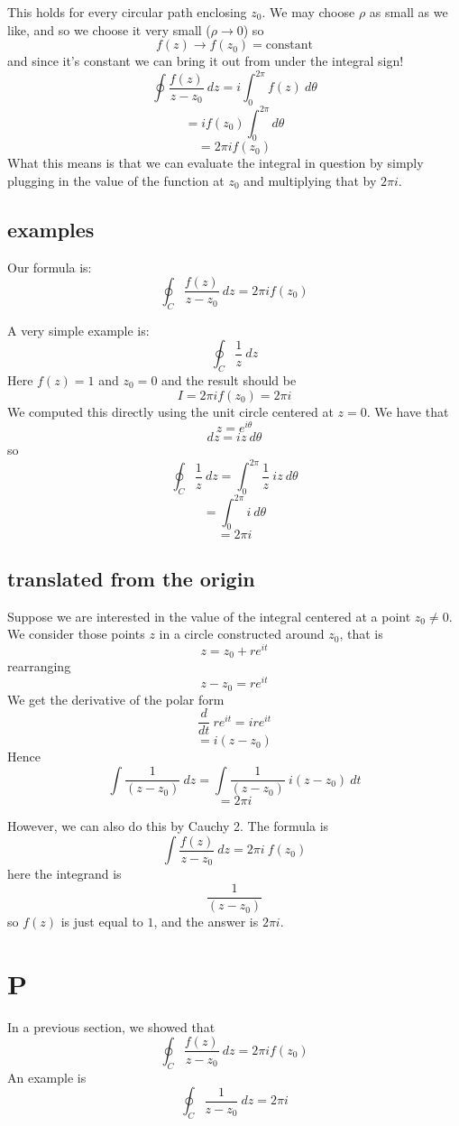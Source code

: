 \documentclass[11pt, oneside]{article}   	%
\begin{document}
This holds for every circular path enclosing $z_0$.  We may choose $\rho$ as small as we like, and so we choose it very small ($\rho \rightarrow 0$) so
\[ f(z) \rightarrow f(z_0) = \text{constant} \]
and since it's constant we can bring it out from under the integral sign!
\[  \oint \frac{f(z)}{z - z_0} \ dz = i \int_0^{2\pi}  f(z) \ d \theta \] 
\[ = i f(z_0) \int_0^{2\pi} d \theta \]
\[ = 2 \pi i f(z_0) \]
What this means is that we can evaluate the integral in question by simply plugging in the value of the function at $z_0$ and multiplying that by $2 \pi i$.

\subsection*{examples}
Our formula is:
\[ \oint_{C} \frac{f(z)}{z-z_0} \ dz = 2 \pi i f(z_0) \]

A very simple example is:
\[ \oint_{C} \frac{1}{z} \ dz \]
Here $f(z) = 1$ and $z_0 = 0$ and the result should be
\[ I = 2 \pi i f(z_0) = 2 \pi i  \]
We computed this directly using the unit circle centered at $z = 0$.  We have that
\[ z = e^{i\theta} \]
\[ dz = i z \ d \theta \]
so
\[ \oint_{C} \frac{1}{z} \ dz = \int_0^{2 \pi}  \frac{1}{z} \ i z \ d \theta \]
\[ = \int_0^{2 \pi} i \ d \theta \]
\[ = 2 \pi i \]

\subsection*{translated from the origin}
Suppose we are interested in the value of the integral centered at a point $z_0 \ne 0$.  We consider those points $z$ in a circle constructed around $z_0$, that is
\[ z = z_0 + re^{it} \]
rearranging
\[ z - z_0 = re^{it} \]
We get the derivative of the polar form
\[ \frac{d}{dt} \ re^{it} = i re^{it}  \]
\[ = i(z-z_0) \]
Hence
\[ \int \frac{1}{(z-z_0)} \ dz  = \int \frac{1}{(z-z_0)} \ i(z - z_0) \ dt \]
\[ = 2 \pi i \]

However, we can also do this by Cauchy 2. The formula is
\[ \int \frac{f(z)}{z - z_0} \ dz = 2 \pi i \ f(z_0) \]
here the integrand is
\[ \frac{1}{(z-z_0)} \]
so $f(z)$ is just equal to $1$, and the answer is $2 \pi i$.

\section{P}
In a previous section, we showed that
\[ \oint_C \frac{f(z)}{z-z_0} \ dz = 2 \pi i f(z_0) \]
An example is
\[ \oint_C \frac{1}{z-z_0} \ dz = 2 \pi i \]
\end{document}
